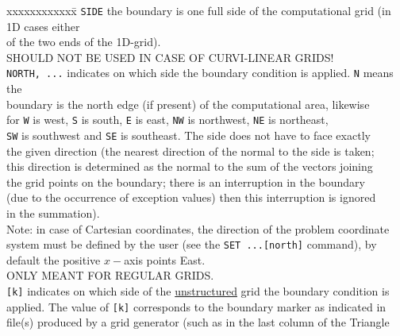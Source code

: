 \documentclass[12pt]{book}
\begin{document}
\begin{tabbing}
xxxxxxxxxxxx\= \kill
{\tt SIDE}           \> the boundary is one full side of the computational grid (in 1D cases either\+\\
                        of the two ends of the 1D-grid).\\
                        SHOULD NOT BE USED IN CASE OF CURVI-LINEAR GRIDS!\-\\
{\tt NORTH, ...}     \> indicates on which side the boundary condition is applied. {\tt N} means the\+\\
                        boundary is the north edge (if present) of the computational area, likewise\\
                        for {\tt W} is west, {\tt S} is south, {\tt E} is east, {\tt NW} is northwest, {\tt NE} is northeast,\\
                        {\tt SW} is southwest and {\tt SE} is southeast. The side does not have to face exactly\\
                        the given direction (the nearest direction of the normal to the side is taken;\\
                        this direction is determined as the normal to the sum of the vectors joining\\
                        the grid points on the boundary; there is an interruption in the boundary\\
                        (due to the occurrence of exception values) then this interruption is ignored\\
                        in the summation).\\
                        Note: in case of Cartesian coordinates, the direction of the problem coordinate\\
                        system must be defined by the user (see the {\tt SET ...[north]} command), by\\
                        default the positive $x-$axis points East.\\
                        ONLY MEANT FOR REGULAR GRIDS.\-\\
{\tt [k]}            \> indicates on which side of the \underline{unstructured} grid the boundary condition is\+\\
                        applied. The value of {\tt [k]} corresponds to the boundary marker as indicated in\\
                        file(s) produced by a grid generator (such as in the last column of the Triangle\\

\end{tabbing}
\end{document}
